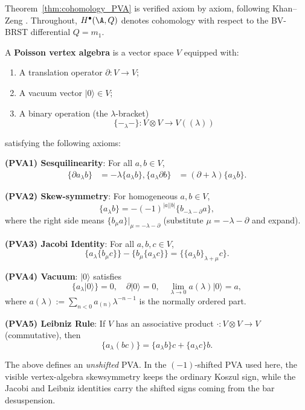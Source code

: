 Theorem~\ref{thm:cohomology_PVA} is verified axiom by axiom, following Khan--Zeng \cite{KZ25}. Throughout, $H^\bullet(\A, Q)$ denotes cohomology with respect to the BV-BRST differential $Q = m_1$.

\begin{definition}
A \textbf{Poisson vertex algebra} is a vector space $V$ equipped with:
\begin{enumerate}[label=(\roman*)]
\item A translation operator $\partial : V \to V$;
\item A vacuum vector $|0\rangle \in V$;
\item A binary operation (the $\lambda$-bracket)
\[
\{-_\lambda -\} : V \otimes V \longrightarrow V((\lambda))
\]
\end{enumerate}
satisfying the following axioms:

\textbf{(PVA1) Sesquilinearity}: For all $a, b \in V$,
\begin{align}
\{\partial a_\lambda b\} &= -\lambda \{a_\lambda b\}, %
\{a_\lambda \partial b\} &= (\partial + \lambda) \{a_\lambda b\}. %
\end{align}

\textbf{(PVA2) Skew-symmetry}: For homogeneous $a, b \in V$,
\[
\{a_\lambda b\} = -(-1)^{|a||b|}\{b_{-\lambda - \partial} a\}, %
\]
where the right side means $\{b_\mu a\}|_{\mu = -\lambda - \partial}$ (substitute $\mu = -\lambda - \partial$ and expand).

\textbf{(PVA3) Jacobi Identity}: For all $a, b, c \in V$,
\[
\{ a_\lambda \{b_\mu c\} \} - \{ b_\mu \{a_\lambda c\} \} = \{ \{a_\lambda b\}_{\lambda + \mu} c \}. %
\]

\textbf{(PVA4) Vacuum}: $|0\rangle$ satisfies
\[
\{a_\lambda |0\rangle\} = 0, \quad \partial |0\rangle = 0, \quad \lim_{\lambda \to 0} a(\lambda) |0\rangle = a,
\]
where $a(\lambda) := \sum_{n < 0} a_{(n)} \lambda^{-n-1}$ is the normally ordered part.

\textbf{(PVA5) Leibniz Rule}: If $V$ has an associative product $\cdot : V \otimes V \to V$ (commutative), then
\[
\{a_\lambda (bc)\} = \{a_\lambda b\} c + \{a_\lambda c\} b. %
\]
\end{definition}

\begin{remark}
The above defines an \emph{unshifted} PVA. In the $(-1)$-shifted
PVA used here, the visible vertex-algebra skewsymmetry keeps the
ordinary Koszul sign, while the Jacobi and Leibniz identities carry
the shifted signs coming from the bar desuspension.
\end{remark}

